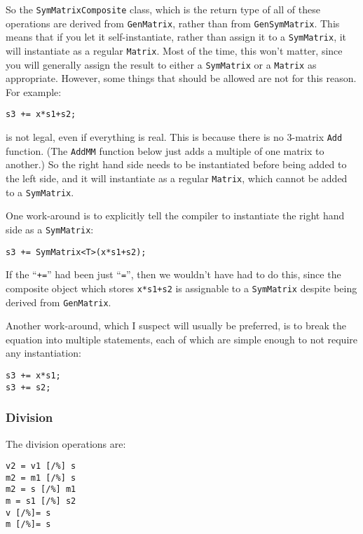 \documentclass[twoside,letterpaper,11pt]{article}
\renewcommand{\tt}[1]{{\texttt {#1}}}
\begin{document}
So the \tt{SymMatrixComposite} class, which is the return type of all of these operations are derived from \tt{GenMatrix},
rather than from \tt{GenSymMatrix}.  This means that if you let it
self-instantiate, rather than assign it to a \tt{SymMatrix}, it will 
instantiate as a regular \tt{Matrix}.  Most of the time, this won't matter, since
you will generally assign the result to either a \tt{SymMatrix} or a \tt{Matrix}
as appropriate.  However, some things that should be allowed are not for this
reason.  For example:
\begin{verbatim}
s3 += x*s1+s2;
\end{verbatim}
is not legal, even if everything is real.  This is because there is no 3-matrix 
\tt{Add} function.  (The \tt{AddMM} function below just adds a multiple of one 
matrix to another.)  So the right hand side needs to be instantiated before
being added to the left side, and it will instantiate as a regular \tt{Matrix},
which cannot be added to a \tt{SymMatrix}.  

One work-around is to explicitly tell the compiler to instantiate the right hand
side as a \tt{SymMatrix}:
\begin{verbatim}
s3 += SymMatrix<T>(x*s1+s2);
\end{verbatim}
If the ``\tt{+=}'' had been just ``\tt{=}'', then we wouldn't have had to do this,
since the composite object which stores \tt{x*s1+s2} is assignable to a \tt{SymMatrix}
despite being derived from \tt{GenMatrix}.

Another work-around, which I suspect will usually be preferred, is to break the 
equation into multiple statements, each of which are simple enough to not require
any instantiation:
\begin{verbatim}
s3 += x*s1;
s3 += s2;
\end{verbatim}

\subsubsection{Division}

The division operations are:
\begin{verbatim}
v2 = v1 [/%] s
m2 = m1 [/%] s
m2 = s [/%] m1
m = s1 [/%] s2
v [/%]= s
m [/%]= s
\end{verbatim}
\end{document}
